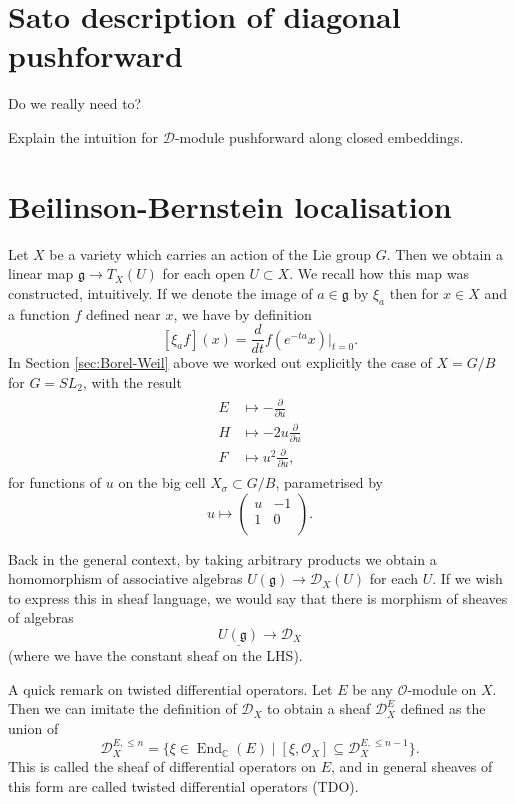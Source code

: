 \documentclass[12pt]{article}
\theoremstyle{plain}
\theoremstyle{definition}
\numberwithin{equation}{section}
\DeclareMathOperator{\en}{End}
\newcommand{\C}{\mathbb{C}}
\newcommand{\g}{\mathfrak{g}}
\newcommand{\CD}{\mathcal{D}}
\newcommand{\OO}{\mathcal{O}}
\begin{document}
\section{Sato description of diagonal pushforward}


Do we really need to?


{\color{red}Explain the intuition for $\CD$-module pushforward along closed embeddings.}




\section{Beilinson-Bernstein localisation}




Let $X$ be a variety which carries an action of the Lie group $G$. Then we obtain a linear map $\g \rightarrow T_X(U)$ for each open $U \subset X$. We recall how this map was constructed, intuitively. If we denote the image of $a \in \g$ by $\xi_a$ then for $x \in X$ and a function $f$ defined near $x$, we have by definition
\[
[\xi_a f](x) = \frac{d}{dt} f(e^{-ta} x)|_{t=0}.
\]
In Section \ref{sec:Borel-Weil} above we worked out explicitly the case of $X = G / B$ for $G = SL_2$, with the result
\begin{align}\label{eq:untwisted.DO}
\begin{split}
E &\mapsto -\frac{\partial}{\partial u} \\
%
H &\mapsto -2 u \frac{\partial}{\partial u} \\
%
F &\mapsto u^2 \frac{\partial}{\partial u},
\end{split}
\end{align}
for functions of $u$ on the big cell $X_\sigma \subset G / B$, parametrised by
\[
u \mapsto \left(\begin{array}{cc}
u & -1 \\
1 & 0 \\
\end{array}
\right).
\]

Back in the general context, by taking arbitrary products we obtain a homomorphism of associative algebras $U(\g) \rightarrow \CD_X(U)$ for each $U$. If we wish to express this in sheaf language, we would say that there is morphism of sheaves of algebras
\[
\underline{U(\g)} \rightarrow \CD_X
\]
(where we have the constant sheaf on the LHS).

A quick remark on twisted differential operators. Let $E$ be any $\OO$-module on $X$. Then we can imitate the definition of $\CD_X$ to obtain a sheaf $\CD_X^E$ defined as the union of
\[
\CD_X^{E, \leq n} = \{\xi \in \en_\C(E) \mid [\xi, \OO_X] \subseteq \CD_X^{E, \leq n-1}\}.
\]
This is called the sheaf of differential operators on $E$, and in general sheaves of this form are called twisted differential operators (TDO).
\end{document}
